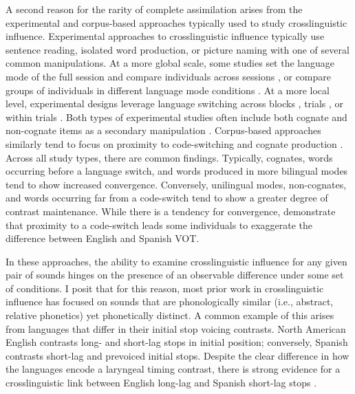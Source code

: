 A second reason for the rarity of complete assimilation arises from the experimental and corpus-based approaches typically used to study crosslinguistic influence. Experimental approaches to crosslinguistic influence typically use sentence reading, isolated word production, or picture naming with one of several common manipulations. At a more global scale, some studies set the language mode of the full session and compare individuals across sessions \citep{grosjean_2011_transfer, simonet_2019_convergence, sancier_1997_drift}, or compare groups of individuals in different language mode conditions \citep{antoniou_2010_context}. At a more local level, experimental designs leverage language switching across blocks \citep{sundara_2006_production}, trials \citep{goldrick_2014_switching}, or within trials \citep[i.e., prompted code-switching][]{bullock_2009_sociophonetics,antoniou_2011_VOT}. Both types of experimental studies often include both cognate and non-cognate items as a secondary manipulation \citep{}. Corpus-based approaches similarly tend to focus on proximity to code-switching \citep{fricke_2016_phonetic, balukas_2015_vot} and cognate production \citep{brown_2015_finegrained}. Across all study types, there are common findings. Typically, cognates, words occurring before a language switch, and words produced in more bilingual modes tend to show increased convergence. Conversely, unilingual modes, non-cognates, and words occurring far from a code-switch tend to show a greater degree of contrast maintenance. While there is a tendency for convergence, \citet{bullock_2009_sociophonetics} demonstrate that proximity to a code-switch leads some individuals to exaggerate the difference between English and Spanish VOT. 

In these approaches, the ability to examine crosslinguistic influence for any given pair of sounds hinges on the presence of an observable difference under some set of conditions. I posit that for this reason, most prior work in crosslinguistic influence has focused on sounds that are phonologically similar (i.e., abstract, relative phonetics) yet phonetically distinct. A common example of this arises from languages that differ in their initial stop voicing contrasts. North American English contrasts long- and short-lag stops in initial position; conversely, Spanish contrasts short-lag and prevoiced initial stops. Despite the clear difference in how the languages encode a laryngeal timing contrast, there is strong evidence for a crosslinguistic link between English long-lag and Spanish short-lag stops \citep{casillas_2021_interlingual, fricke_2016_phonetic, goldrick_2014_switching, bullock_2009_sociophonetics, olson_2016_transfer}. 


